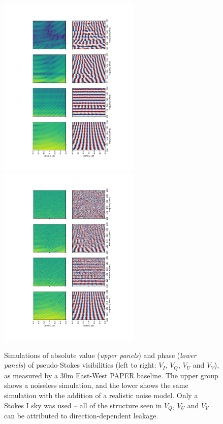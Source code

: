 \begin{figure}
\centering
\includegraphics[width=0.6\textwidth, angle=270]{chapters/polcal/figures/sim_nonoise.pdf}
\includegraphics[width=0.6\textwidth, angle=270]{chapters/polcal/figures/sim.pdf}
\caption[Simulations of pseudo-Stokes visibilities,]{Simulations of absolute value (\textit{upper panels}) and phase (\textit{lower panels}) of pseudo-Stokes visibilities (left to right: $V_I$, $V_Q$, $V_U$ and $V_V$), as measured by a 30m East-West PAPER baseline. The upper group shows a noiseless simulation, and the lower shows the same simulation with the addition of a realistic noise model. Only a Stokes I sky was used -- all of the structure seen in $V_Q$, $V_U$ and $V_V$ can be attributed to direction-dependent leakage.}
\label{fig:simvis}
\end{figure}



